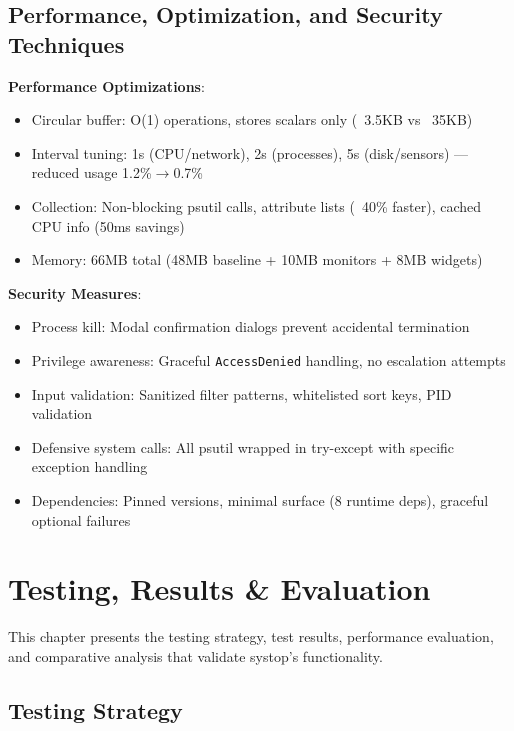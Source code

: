 \documentclass[12pt,a4paper,oneside]{report}
\begin{document}
\section{Performance, Optimization, and Security Techniques}
\label{sec:performance-optimization}

\textbf{Performance Optimizations}:
\begin{itemize}
    \item Circular buffer: O(1) operations, stores scalars only (~3.5KB vs ~35KB)
    \item Interval tuning: 1s (CPU/network), 2s (processes), 5s (disk/sensors) --- reduced usage 1.2\%$\rightarrow$0.7\%
    \item Collection: Non-blocking psutil calls, attribute lists (~40\% faster), cached CPU info (50ms savings)
    \item Memory: 66MB total (48MB baseline + 10MB monitors + 8MB widgets)
\end{itemize}

\textbf{Security Measures}:
\begin{itemize}
    \item Process kill: Modal confirmation dialogs prevent accidental termination
    \item Privilege awareness: Graceful \texttt{AccessDenied} handling, no escalation attempts
    \item Input validation: Sanitized filter patterns, whitelisted sort keys, PID validation
    \item Defensive system calls: All psutil wrapped in try-except with specific exception handling
    \item Dependencies: Pinned versions, minimal surface (8 runtime deps), graceful optional failures
\end{itemize}

\chapter{Testing, Results \& Evaluation}
\label{chap:testing}

This chapter presents the testing strategy, test results, performance evaluation, and comparative analysis that validate systop's functionality.

\section{Testing Strategy}
\label{sec:testing-strategy}
\end{document}
